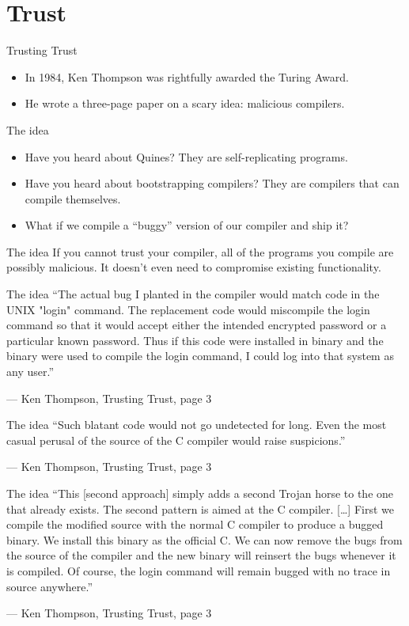 \documentclass[aspectratio=169]{beamer}
\begin{document}
  \section{Trust}
  \begin{frame}{Trusting Trust}
    \begin{itemize}
      \item In 1984, Ken Thompson was rightfully awarded the Turing Award.
      \item He wrote a three-page paper on a scary idea: malicious compilers.
    \end{itemize}
  \end{frame}
  \begin{frame}{The idea}
    \begin{itemize}
      \item Have you heard about Quines? They are self-replicating programs.
      \item Have you heard about bootstrapping compilers? They are compilers
            that can compile themselves.
      \item What if we compile a “buggy” version of our compiler and ship it?
    \end{itemize}
  \end{frame}
  \begin{frame}{The idea}
    If you cannot trust your compiler, all of the programs you compile are
    possibly malicious. It doesn’t even need to compromise existing
    functionality.
  \end{frame}
  \begin{frame}{The idea}
    “The actual bug I planted in the compiler would match code in the UNIX
     "login" command.  The replacement code would miscompile the login
     command so that it would accept either the intended encrypted password
     or a particular known password. Thus if this code were installed in
     binary and the binary were used to compile the login command, I could
     log into that system as any user.”

     \indent — Ken Thompson, Trusting Trust, page 3
  \end{frame}
  \begin{frame}{The idea}
    “Such blatant code would not go undetected for long. Even the most casual
     perusal of the source of the C compiler would raise suspicions.” 

     \indent — Ken Thompson, Trusting Trust, page 3
  \end{frame}
  \begin{frame}{The idea}
    “This [second approach] simply adds a second Trojan horse to the one that
     already exists. The second pattern is aimed at the C compiler. [\ldots] First
     we compile the modified source with the normal C compiler to produce a
     bugged binary. We install this binary as the official C. We can now remove
     the bugs from the source of the compiler and the new binary will reinsert
     the bugs whenever it is compiled. Of course, the login command will remain
     bugged with no trace in source anywhere.”

     \indent — Ken Thompson, Trusting Trust, page 3
  \end{frame}
\end{document}
